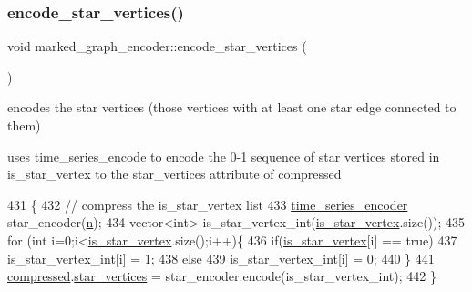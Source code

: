 \mbox{\label{classmarked__graph__encoder_af8daeed1452dbfd41fa2f875813e3496}} 
\subsubsection{\texorpdfstring{encode\+\_\+star\+\_\+vertices()}{encode\_star\_vertices()}}
{\footnotesize\ttfamily void marked\+\_\+graph\+\_\+encoder\+::encode\+\_\+star\+\_\+vertices (\begin{DoxyParamCaption}{ }\end{DoxyParamCaption})\hspace{0.3cm}{\ttfamily [private]}}



encodes the star vertices (those vertices with at least one star edge connected to them) 

uses time\+\_\+series\+\_\+encode to encode the 0-\/1 sequence of star vertices stored in is\+\_\+star\+\_\+vertex to the star\+\_\+vertices attribute of compressed 
\begin{DoxyCode}
431 \{
432   \textcolor{comment}{// compress the is\_star\_vertex list}
433   \hyperlink{classtime__series__encoder}{time\_series\_encoder} star\_encoder(\hyperlink{classmarked__graph__encoder_a4c66d9fdbc14c97523715aac7e4511cb}{n});
434   vector<int> is\_star\_vertex\_int(\hyperlink{classmarked__graph__encoder_ac36f6c2430af6fa4d20584569859bb59}{is\_star\_vertex}.size());
435   \textcolor{keywordflow}{for} (\textcolor{keywordtype}{int} i=0;i<\hyperlink{classmarked__graph__encoder_ac36f6c2430af6fa4d20584569859bb59}{is\_star\_vertex}.size();i++)\{
436     \textcolor{keywordflow}{if}(\hyperlink{classmarked__graph__encoder_ac36f6c2430af6fa4d20584569859bb59}{is\_star\_vertex}[i] == \textcolor{keyword}{true})
437       is\_star\_vertex\_int[i] = 1;
438     \textcolor{keywordflow}{else}
439       is\_star\_vertex\_int[i] = 0;
440   \}
441   \hyperlink{classmarked__graph__encoder_ac2ded200860fdd2321f86dd76b28bcb3}{compressed}.\hyperlink{classmarked__graph__compressed_a7a4ced4586e2e353f9076bd447df5208}{star\_vertices} = star\_encoder.encode(is\_star\_vertex\_int);
442 \}
\end{DoxyCode}
\mbox{\label{classmarked__graph__encoder_a239769085214166e09cb56de750a8d71}} 
